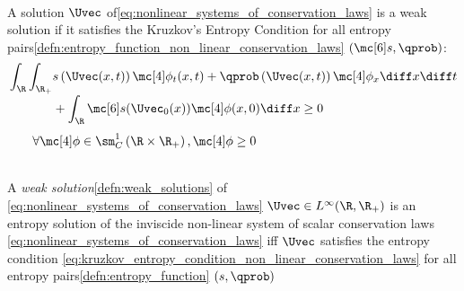 \begin{corbox}\nospacing
    \begin{cor}
        \label{cor:entropy_condition_for_distributions_non_linear_conservation_laws}\leavevmode\\
          A solution $\Uvec$ of\cref{eq:nonlinear_systems_of_conservation_laws} is a weak solution
          if it satisfies the Kruzkov's Entropy Condition for all entropy pairs\cref{defn:entropy_function_non_linear_conservation_laws} $(\entropy,\qprob)$:
          \begin{align}
            \int_{\R}\int_{\R_{+}}&s \left(\Uvec(x,t)\right)\testfunc_{t}(x,t)+\qprob\left(\Uvec(x,t)\right)\testfunc_{x}\diff x\diff t\nonumber \\[-1\jot]
            &+\int_{\R}\entropy(\Uvec_{0}(x))\testfunc(x,0)\diff x\geq0\label{eq:kruzkov_entropy_condition_non_linear_conservation_laws}
          \end{align}
          \hfill$\qquad\forall\testfunc\in\sm_{C}^{1}\left(\R\times\R_{+}\right),\testfunc\geq0\nonumber$
    \end{cor}
\end{corbox}
\begin{defnbox}\nospacing
    \begin{defn}\label{defn:entropy_solution_non_linear_conservation_laws}\leavevmode\\
        A \textit{weak solution}\cref{defn:weak_solutions} of \cref{eq:nonlinear_systems_of_conservation_laws} $\Uvec\in L^{\infty}(\R,\R_{+})$
        is an entropy solution of the inviscide non-linear system of scalar conservation laws \cref{eq:nonlinear_systems_of_conservation_laws} iff
        $\Uvec$ satisfies the entropy condition \cref{eq:kruzkov_entropy_condition_non_linear_conservation_laws} for all entropy pairs\cref{defn:entropy_function} $(s,\qprob)$
    \end{defn}
\end{defnbox}

